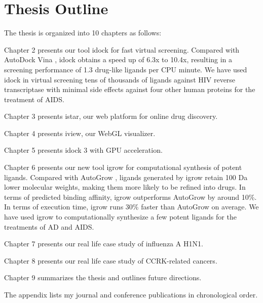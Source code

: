 \section{Thesis Outline}

The thesis is organized into 10 chapters as follows:

Chapter 2 presents our tool idock for fast virtual screening. Compared with AutoDock Vina \citep{595}, idock obtains a speed up of 6.3x to 10.4x, resulting in a screening performance of 1.3 drug-like ligands per CPU minute. We have used idock in virtual screening tens of thousands of ligands against HIV reverse transcriptase with minimal side effects against four other human proteins for the treatment of AIDS.

Chapter 3 presents istar, our web platform for online drug discovery.

Chapter 4 presents iview, our WebGL visualizer.

Chapter 5 presents idock 3 with GPU acceleration.

Chapter 6 presents our new tool igrow for computational synthesis of potent ligands. Compared with AutoGrow \citep{466}, ligands generated by igrow retain 100 Da lower molecular weights, making them more likely to be refined into drugs. In terms of predicted binding affinity, igrow outperforms AutoGrow by around 10\%. In terms of execution time, igrow runs 30\% faster than AutoGrow on average. We have used igrow to computationally synthesize a few potent ligands for the treatments of AD and AIDS.

Chapter 7 presents our real life case study of influenza A H1N1.

Chapter 8 presents our real life case study of CCRK-related cancers.

Chapter 9 summarizes the thesis and outlines future directions.

The appendix lists my journal and conference publications in chronological order.

\chapterend
